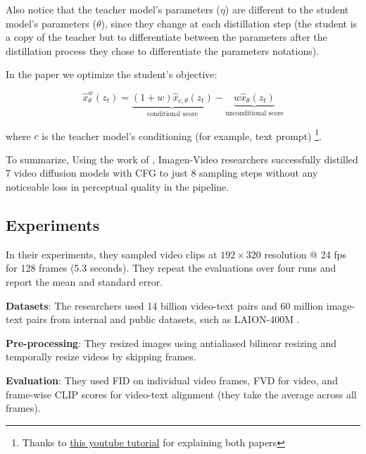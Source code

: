 Also notice that the teacher model's parameters ($\eta$) are different to the student model's parameters ($\theta$), since they change at each distillation step (the student is a copy of the teacher but to differentiate between the parameters after the distillation process they chose to differentiate the parameters notations).

In the \cite{meng2023distillation} paper we optimize the student's objective:

\[  
    \hat{x}_{\theta}^w(z_t) = 
    \underbrace{(1+w) \hat{x}_{c,\theta} (z_t)}_{\text{conditional score}} - 
    \underbrace{w \hat{x}_\theta (z_t)}_{\text{unconditional score}}
\]

where $c$ is the teacher model's conditioning (for example, text prompt) \footnote{Thanks to \href{https://www.youtube.com/watch?v=ZXuK6IRJlnk}{this youtube tutorial} for explaining both papers}.

To summarize, Using the work of \cite{meng2023distillation}, Imagen-Video researchers successfully distilled 7 video diffusion models with CFG to just 8 sampling steps without any noticeable loss in perceptual quality in the pipeline.

















\subsection{Experiments}

In their experiments, they sampled video clips at $192\times 320$ resolution @ 24 fps for 128 frames (5.3 seconds). They repeat the evaluations over four runs and report the mean and standard error.

\textbf{Datasets}: The researchers used 14 billion video-text pairs and 60 million image-text pairs from internal and public datasets, such as LAION-400M \cite{laion_400m}.

\textbf{Pre-processing}: They resized images using antialiased bilinear resizing and temporally resize videos by skipping frames.

\textbf{Evaluation}: They used FID on individual video frames, FVD for video, and frame-wise CLIP scores for video-text alignment (they take the average across all frames).

